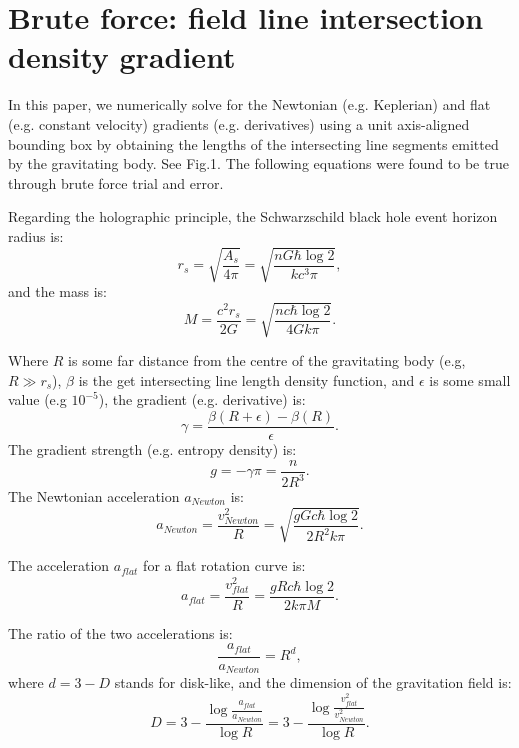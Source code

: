 \documentclass[12pt]{article}
\begin{document}
\section{Brute force: field line intersection density gradient}

In this paper, we numerically solve for the Newtonian (e.g. Keplerian) and flat (e.g. constant velocity) gradients (e.g. derivatives) using a unit axis-aligned bounding box by obtaining the lengths of the intersecting line segments emitted by the gravitating body. See Fig.1. 
The following equations were found to be true through brute force trial and error.

Regarding the holographic principle, the Schwarzschild black hole event horizon radius is:
\begin{equation}
r_s = \sqrt{\frac{A_s}{4 \pi}} = \sqrt{\frac{n G \hbar \log 2}{k c^3 \pi}},
\end{equation}
and the mass is:
\begin{equation}
M = \frac{c^2 r_s}{2 G} = \sqrt{\frac{n c \hbar \log 2}{4 G k \pi}}. 
\end{equation}

Where $R$ is some far distance from the centre of the gravitating body (e.g, $R \gg r_s$), $\beta$ is the get intersecting line length density function, and $\epsilon$ is some small value (e.g $10^{-5}$), the gradient (e.g. derivative) is:
\begin{equation}
\gamma = \frac{\beta(R + \epsilon) - \beta(R)}{\epsilon}.
\end{equation}
The gradient strength (e.g. entropy density) is:
\begin{equation}
g = -\gamma \pi = \frac{n}{2 R^3}.
\end{equation}
The Newtonian acceleration $a_{\textit{Newton}}$ is:
\begin{equation}
a_{\textit{Newton}} = \frac{v_{\textit{Newton}}^2}{R} = \sqrt{\frac{g G c \hbar \log 2}{2 R^2 k \pi}}.
\end{equation}

The acceleration $a_{\textit{flat}}$ for a flat rotation curve is:
\begin{equation}
a_{\textit{flat}} = \frac{v_{\textit{flat}}^2}{R} = \frac{g R c \hbar \log 2}{2 k \pi M}.
\end{equation}

The ratio of the two accelerations is:
\begin{equation}
\frac{a_{\textit{flat}}}{a_{\textit{Newton}}} = R^{d}, 
\end{equation}
where $d = 3 - D$ stands for disk-like, and the dimension of the gravitation field is:
\begin{equation}
D = 3 - \frac{\log \frac{a_{\textit{flat}}}{a_{\textit{Newton}}}}{\log R} = 3 - \frac{\log \frac{v_{\textit{flat}}^2}{v_{\textit{Newton}}^2}}{\log R}.
\end{equation}
\end{document}
